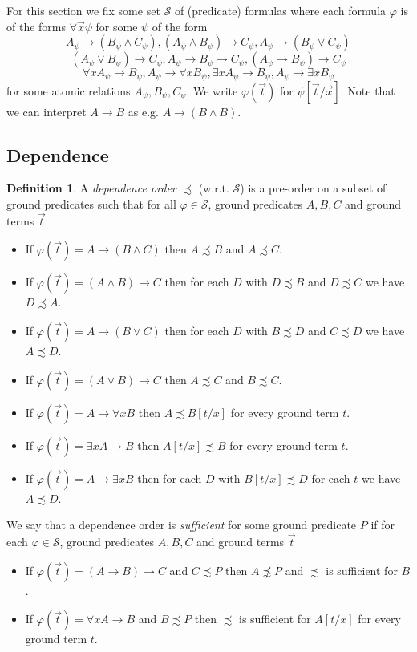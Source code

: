 \documentclass[a4paper,12pt]{report}
\theoremstyle{definition}
\theoremstyle{definition}
\theoremstyle{definition}
\theoremstyle{definition}
\theoremstyle{definition}
\newtheorem{definition}[theorem]{Definition}
\theoremstyle{definition}
\theoremstyle{definition}
\begin{document}
	For this section we fix some set $\mathcal S$ of (predicate) formulas where each formula $\varphi$ is of the forms $\forall \vec x\psi$ for some $\psi$ of the form
	$$A_\psi\to(B_\psi\wedge C_\psi), (A_\psi\wedge B_\psi)\to C_\psi, A_\psi\to (B_\psi\vee C_\psi)$$$$(A_\psi\vee B_\psi)\to C_\psi, A_\psi\to B_\psi\to C_\psi, (A_\psi\to B_\psi)\to  C_\psi$$$$\forall xA_\psi\to B_\psi, A_\psi\to \forall xB_\psi, \exists xA_\psi\to B_\psi, A_\psi\to\exists xB_\psi$$
	for some atomic relations $A_\psi, B_\psi, C_\psi$. We write $\varphi(\vec t)$ for $\psi[\vec t/\vec x]$. Note that we can interpret $A\to B$ as e.g. $A\to (B\wedge B)$. 
	
	\subsection{Dependence}
	
	\begin{definition}
		A \textit{dependence order} $\precsim$ (w.r.t. $\mathcal S$) is a pre-order on a subset of ground predicates such that for all $\varphi\in\mathcal S$, ground predicates $A, B, C$ and ground terms $\vec t$
		\begin{itemize}
			\item If $\varphi(\vec t) = A\to (B\wedge C)$ then $A\precsim B$ and $A\precsim C$.
			\item If $\varphi(\vec t) = (A\wedge B)\to C$ then for each $D$ with $D\precsim B$ and $D\precsim C$ we have $D\precsim A$.
			\item If $\varphi(\vec t) = A\to (B\vee C)$ then for each $D$ with $B\precsim D$ and $C\precsim D$ we have $A\precsim D$.
			\item If $\varphi(\vec t) = (A\vee B)\to C$ then $A\precsim C$ and $B\precsim C$.
			\item If $\varphi(\vec t) = A\to \forall xB$ then $A\precsim B[t/x]$ for every ground term $t$.
			\item If $\varphi(\vec t) = \exists xA\to B$ then $A[t/x]\precsim B$ for every ground term $t$.
			\item If $\varphi(\vec t) = A\to \exists xB$ then for each $D$ with $B[t/x]\precsim D$ for each $t$ we have $A\precsim D$.
		\end{itemize}
		We say that a dependence order is \textit{sufficient} for some ground predicate $P$ if for each $\varphi\in\mathcal S$, ground predicates $A, B, C$ and ground terms $\vec t$
		\begin{itemize}
			\item If $\varphi(\vec t) = (A\to B)\to C$ and $C\precsim P$ then $A\not\precsim P$ and $\precsim$ is sufficient for $B$.
			\item If $\varphi(\vec t) = \forall xA\to B$ and $B\precsim P$ then $\precsim$ is sufficient for $A[t/x]$ for every ground term $t$.
		\end{itemize}
	\end{definition}
	
\end{document}
